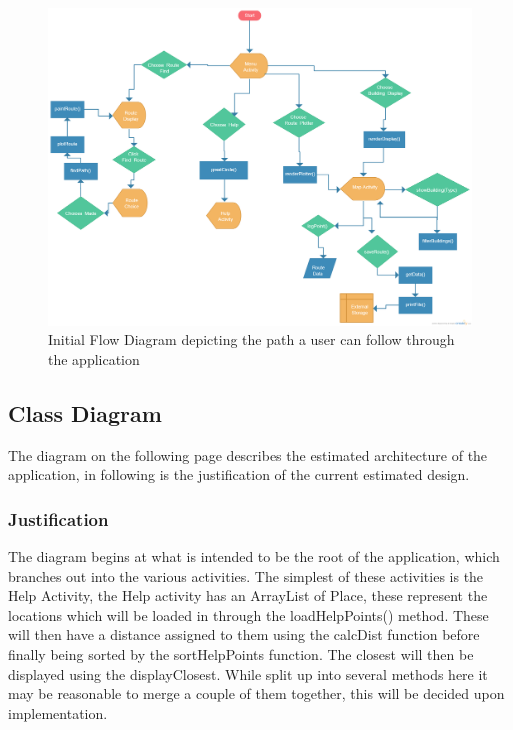 \newpage
{}


\begin{figure}
\includegraphics[scale=0.24]{Design/Flow.png}
\caption[Initial Flow Diagram]{Initial Flow Diagram depicting the path a user can follow through the application}
\end{figure}


\newpage
\restoregeometry
\subsection{Class Diagram}
The diagram on the following page describes the estimated architecture of the application, in following is the justification of the current estimated design.
\subsubsection{Justification}
The diagram begins at what is intended to be the root of the application, which branches out into the various activities. The simplest of these activities is the Help Activity, the Help activity has an ArrayList of Place, these represent the locations which will be loaded in through the loadHelpPoints() method. These will then have a distance assigned to them using the calcDist function before finally being sorted by the sortHelpPoints function. The closest will then be displayed using the displayClosest. While split up into several methods here it may be reasonable to merge a couple of them together, this will be decided upon implementation. 

